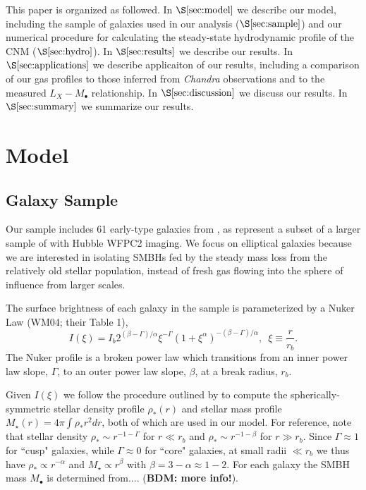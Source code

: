 \documentclass[usenatbib,fleqn]{mn2e}
\newcommand{\rb}{r_b}
\newcommand{\rhostar}{\rho_*}
\newcommand{\Mbh}[1][]{M_{\bullet#1}}
\begin{document}
This paper is organized as followed.  In $\S\ref{sec:model}$ we describe our model, including the sample of galaxies used in our analysis ($\S\ref{sec:sample}$) and our numerical procedure for calculating the steady-state hydrodynamic profile of the CNM ($\S\ref{sec:hydro}$).  In $\S\ref{sec:results}$ we describe our results.  In $\S\ref{sec:applications}$ we describe applicaiton of our results, including a comparison of our gas profiles to those inferred from {\it Chandra} observations and to the measured $L_X-\Mbh$ relationship.  In $\S\ref{sec:discussion}$ we discuss our results.  In $\S\ref{sec:summary}$ we summarize our results.  

\section{Model}
\label{sec:model}

\subsection{Galaxy Sample}

\label{sec:sample}

Our sample includes 61 early-type galaxies from , as represent a subset of a larger sample of \citet{FaberTremaine+:1997a} with Hubble WFPC2 imaging.  We focus on elliptical galaxies because we are interested in isolating SMBHs fed by the steady mass loss from the relatively old stellar population, instead of fresh gas flowing into the sphere of influence from larger scales.

The surface brightness of each galaxy in the sample is parameterized by a Nuker Law (WM04; their Table 1),
\begin{equation}
  I(\xi)=I_b 2^{(\beta-\Gamma)/\alpha} \xi^{-\Gamma} (1+\xi^\alpha)^{-(\beta-\Gamma)/\alpha}, \,\,\,\xi\equiv\frac{r}{r_b}.
\end{equation}
The Nuker profile is a broken power law which transitions from an inner power law slope, $\Gamma$, to an outer power law slope, $\beta$, at a break radius, $\rb$.  

Given $I(\xi)$ we follow the procedure outlined by  to compute the spherically-symmetric stellar density profile $\rhostar(r)$ and stellar mass profile $M_{\star}(r) = 4\pi \int \rhostar r^{2}dr$, both of which are used in our model.  For reference, note that stellar density $\rhostar\sim r^{-1-\Gamma}$ for $r \ll \rb$ and $\rhostar\sim r^{-1-\beta}$ for $r \gg \rb$.  Since $\Gamma\approx 1$ for ``cusp" galaxies, while $\Gamma\approx 0$ for ``core" galaxies, at small radii $\ll \rb$ we thus have $\rhostar \propto r^{-\alpha}$ and $M_{\star} \propto r^{\beta}$ with $\beta = 3-\alpha \approx 1-2$.  For each galaxy the SMBH mass $\Mbh$ is determined from.... ({\bf BDM: more info!}).
\end{document}
